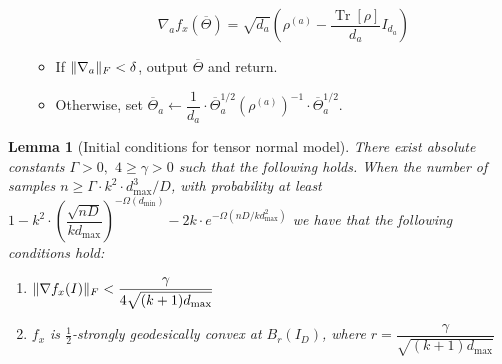 \documentclass[aos]{imsart}
\newtheorem{lemma}[theorem]{Lemma}
\theoremstyle{definition}
\numberwithin{equation}{section}
\DeclareMathOperator{\tr}{Tr}
\DeclarePairedDelimiter{\norm}{\lVert}{\rVert}
\newcommand{\otheta}{\overline{\Theta}}
\def\dmin{d_{\min}}
\def\dmax{d_{\max}}
\begin{document}
\begin{Algorithm}
\begin{enumerate}
\begin{itemize}
$$ \nabla_a f_x(\otheta) = \sqrt{d_a} \left( \rho^{(a)} - \dfrac{\tr[\rho]}{d_a} I_{d_a} \right) $$

\vspace{5pt}

\item
If $\norm{\nabla_a}_F < \delta$, output $\otheta$ and return.

\vspace{5pt}

\item Otherwise, set $\otheta_a \leftarrow  \dfrac{1}{d_a} \cdot \otheta_a^{1/2} (\rho^{(a)})^{-1} \cdot \otheta_a^{1/2}$.
\end{itemize}
\end{enumerate}
\caption{Tensor flip-flop algorithm}\label{alg:tensor-flip-flop}
\end{Algorithm}




\begin{lemma}[Initial conditions for tensor normal model]\label{lem:tensor-initial-conditions}
	There exist absolute constants $\Gamma > 0,$ $4 \geq \gamma > 0$ such that the following holds.
	When the number of samples $n \geq \Gamma \cdot k^2 \cdot \dmax^3/D$, with probability at least $1 - k^2 \cdot \left( \dfrac{\sqrt{nD}}{k \dmax} \right)^{-\Omega(\dmin)} - 2k \cdot e^{- \Omega(nD/k \dmax^2)}$ we have that the following conditions hold:
	\begin{enumerate}
		\item $\norm{\nabla f_x(I)}_F < \dfrac{\gamma}{4 \sqrt{(k+1)\dmax}}$
		\item $f_x$ is $\frac{1}{2}$-strongly geodesically convex at
		$B_r(I_D)$, where $r = \dfrac{\gamma}{\sqrt{(k+1) \dmax}}$
	\end{enumerate}
\end{lemma}
\end{document}

